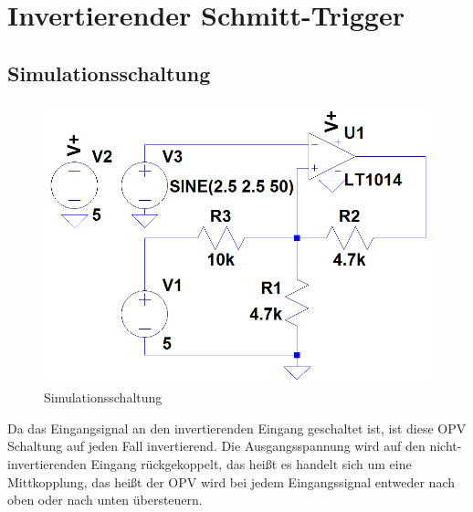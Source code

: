 
\section{Invertierender Schmitt-Trigger}
\subsection{Simulationsschaltung}
\begin{figure}[H]
  \begin{center}
    \includegraphics[width=1\textwidth]{./Schaltungen/InvertierenderSchmittTrigger.png}
    \caption{Simulationsschaltung}
  \end{center}
\end{figure}
\noindent
Da das Eingangsignal an den invertierenden Eingang geschaltet ist, ist diese OPV Schaltung auf jeden Fall invertierend. Die Ausgangsspannung wird auf den nicht-invertierenden Eingang r\"uckgekoppelt, das hei\ss{}t es handelt sich um eine Mittkopplung, das hei\ss{}t der OPV wird bei jedem Eingangssignal entweder nach oben oder nach unten \"ubersteuern.

